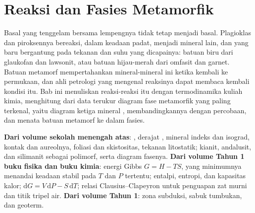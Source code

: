 \chapter{Reaksi dan Fasies Metamorfik}\label{ch:b2:metamorphic-facies}

Basal yang tenggelam bersama lempengnya tidak tetap menjadi basal. Plagioklas dan piroksennya
bereaksi, dalam keadaan padat, menjadi mineral lain, dan  yang baru bergantung pada
tekanan dan suhu yang dicapainya: batuan biru dari glaukofan dan lawsonit, atau
batuan hijau-merah dari omfasit dan garnet. Batuan metamorf mempertahankan mineral-mineral ini ketika
kembali ke permukaan, dan ahli petrologi yang mengenal reaksinya dapat membaca kembali
kondisi itu. Bab ini menuliskan reaksi-reaksi itu dengan termodinamika
kuliah kimia, menghitung dari data terukur diagram fase metamorfik yang paling terkenal,
yaitu diagram ketiga mineral , membandingkannya dengan percobaan, dan menata
 batuan metamorf ke dalam fasies.

\begin{recall}
\textbf{Dari volume sekolah menengah atas}: , derajat , mineral indeks
dan isograd,  kontak dan aureolnya, foliasi dan skistositas,
tekanan litostatik; kianit, andalusit, dan silimanit sebagai polimorf, serta
diagram fasenya. \textbf{Dari volume Tahun 1 buku fisika dan buku kimia}: energi
Gibbs $G = H - TS$, yang minimumnya menandai keadaan stabil pada $T$ dan $P$ tertentu;
entalpi, entropi, dan kapasitas kalor; $\mathrm dG = V\,\mathrm dP - S\,\mathrm dT$;
relasi Clausius--Clapeyron untuk penguapan zat murni dan titik
tripel air. \textbf{Dari volume Tahun 1}: zona subduksi, sabuk tumbukan, dan
geoterm.
\end{recall}

